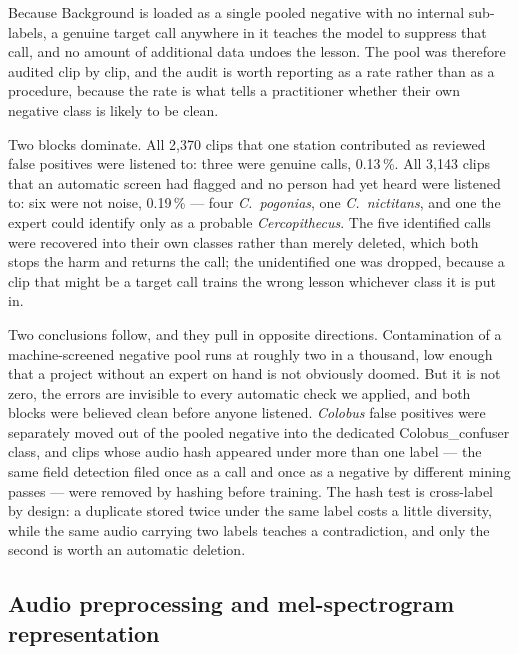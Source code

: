 \documentclass[review,3p,times]{elsarticle}
\begin{document}
\noindent Because Background is loaded as a single pooled negative with no
internal sub-labels, a genuine target call anywhere in it teaches the model to
suppress that call, and no amount of additional data undoes the lesson. The
pool was therefore audited clip by clip, and the audit is worth reporting as a
rate rather than as a procedure, because the rate is what tells a practitioner
whether their own negative class is likely to be clean.

Two blocks dominate. All 2{,}370 clips that one station contributed as reviewed
false positives were listened to: three were genuine calls, 0.13\,\%. All
3{,}143 clips that an automatic screen had flagged and no person had yet heard
were listened to: six were not noise, 0.19\,\% --- four \textit{C.\ pogonias},
one \textit{C.\ nictitans}, and one the expert could identify only as a probable
\textit{Cercopithecus}. The five identified calls were recovered into their own
classes rather than merely deleted, which both stops the harm and returns the
call; the unidentified one was dropped, because a clip that might be a target
call trains the wrong lesson whichever class it is put in.

Two conclusions follow, and they pull in opposite directions. Contamination of a
machine-screened negative pool runs at roughly two in a thousand, low enough
that a project without an expert on hand is not obviously doomed. But it is not
zero, the errors are invisible to every automatic check we applied, and both
blocks were believed clean before anyone listened. \textit{Colobus} false
positives were separately moved out of the pooled negative into the dedicated
Colobus\_confuser class, and clips whose audio hash appeared under more than
one label --- the same field detection filed once as a call and once as a
negative by different mining passes --- were removed by hashing before
training. The hash test is cross-label by design: a duplicate stored twice
under the same label costs a little diversity, while the same audio carrying
two labels teaches a contradiction, and only the second is worth an automatic
deletion.

\subsection*{Audio preprocessing and mel-spectrogram representation}
\end{document}

